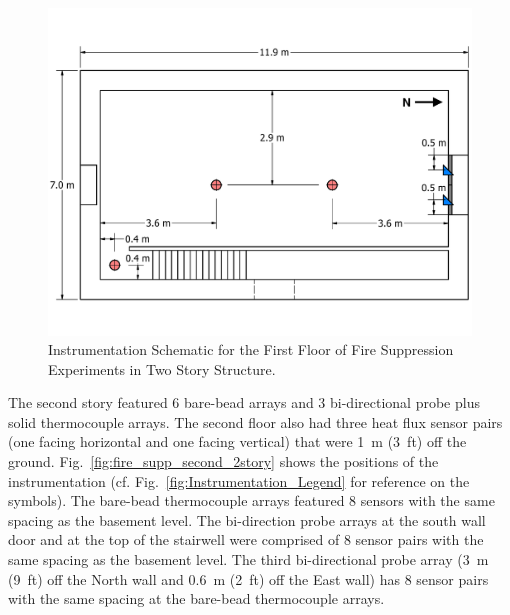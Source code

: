 \documentclass[12pt,oneside]{book}
\begin{document}
\begin{figure}[!ht]
	\includegraphics[width=\columnwidth]{../../DelCo_2014_2015/Drawings/PDFs/CAFS/West_Structure_1st_Floor_Instrumentation}
	\caption{Instrumentation Schematic for the First Floor of Fire Suppression Experiments in Two Story Structure.}
	\label{fig:fire_supp_first_2story}
\end{figure}

The second story featured 6 bare-bead arrays and 3 bi-directional probe plus solid thermocouple arrays. The second floor also had three heat flux sensor pairs (one facing horizontal and one facing vertical) that were 1~m (3~ft) off the ground. Fig.~\ref{fig:fire_supp_second_2story} shows the positions of the instrumentation (cf. Fig.~\ref{fig:Instrumentation_Legend} for reference on the symbols). The bare-bead thermocouple arrays featured 8 sensors with the same spacing as the basement level. The bi-direction probe arrays at the south wall door and at the top of the stairwell were comprised of 8 sensor pairs with the same spacing as the basement level. The third bi-directional probe array (3~m (9~ft) off the North wall and 0.6~m (2~ft) off the East wall) has 8 sensor pairs with the same spacing at the bare-bead thermocouple arrays.
\end{document}
